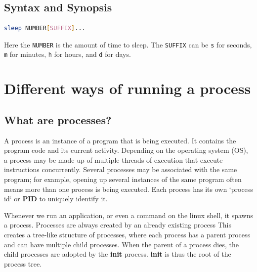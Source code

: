 \subsection{Syntax and Synopsis}

\begin{lstlisting}[language=bash]
sleep NUMBER[SUFFIX]...
\end{lstlisting}

Here the \lstinline|NUMBER| is the amount of time to sleep.
The \lstinline|SUFFIX| can be \lstinline|s| for seconds, \lstinline|m| for minutes,
\lstinline|h| for hours, and \lstinline|d| for days.

\vfill
\pagebreak
\section{Different ways of running a process}

\subsection{What are processes?}

\begin{definition}[Process]
  A process is an instance of a program that is being executed.
  It contains the program code and its current activity.
  Depending on the operating system (OS), a process may be made up of
  multiple threads of execution that execute instructions concurrently.
  Several processes may be associated with the same program; for example,
  opening up several instances of the same program often means more than
  one process is being executed.
  Each process has its own `process id` or \textbf{PID} to uniquely identify it.
\end{definition}

Whenever we run an application, or even a command on the linux shell, it spawns a process. Processes are always created by an already
existing process
This creates a tree-like structure of processes, where each process has a parent process and can have multiple child processes.
When the parent of a process dies, the child processes are adopted by the \textbf{init} process.
\textbf{init} is thus the root of the process tree.

